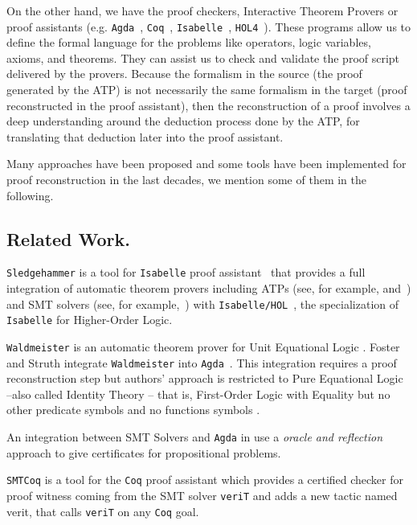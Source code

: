 \documentclass[runningheads,a4paper]{llncs}
\begin{document}
On the other hand, we have the proof checkers, Interactive Theorem Provers
or proof assistants (e.g. \verb!Agda!~\cite{agdateam}, \verb!Coq!~\cite{coqteam}, \verb!Isabelle!~\cite{paulson1994isabelle}, \verb!HOL4!~\cite{norrish2007hol}). These programs allow us to define the formal language for the problems like operators, logic variables, axioms, and theorems. They can assist us to check and validate the proof script delivered by the provers. Because the formalism in the source (the proof generated by the ATP) is not necessarily the same formalism in the target (proof reconstructed in the proof assistant), then the reconstruction of a proof involves a deep understanding around the deduction process done by the ATP, for translating that deduction later into the proof assistant.

Many approaches have been proposed and some tools have been implemented for proof reconstruction in the last decades, we mention some of them in the following.

\subsection*{Related Work.}\label{Related Work}
\par
\verb!Sledgehammer! is a tool for \verb!Isabelle! proof assistant~\cite{paulson1994isabelle} that provides a full integration of automatic theorem provers including ATPs (see, for example, \cite{meng2006automation} and~\cite{blanchette2013extending}) and SMT solvers (see, for example,~\cite{blanchette2013extending}) with \verb!Isabelle/HOL!~\cite{nipkow2002isabelle}, the specialization of \verb!Isabelle! for Higher-Order Logic.

\verb!Waldmeister! is an automatic theorem prover for Unit Equational Logic \cite{hillenbrand1997}. Foster and Struth \cite{foster2011integrating} integrate \verb!Waldmeister! into \verb!Agda!~\cite{agdateam}. This integration requires a proof reconstruction step but authors' approach is restricted to Pure Equational Logic --also called Identity Theory \cite{humberstone2011}-- that is, First-Order Logic with Equality but no other predicate symbols and no functions symbols \cite{appel1959}.

An integration between SMT Solvers and \verb!Agda! in \cite{kanso2016light} use a \emph{oracle and reflection} approach to give certificates for propositional problems.

\verb!SMTCoq! \cite{armand2011} is a tool for the \verb!Coq! proof assistant \cite{coqteam} which provides a certified checker for proof witness coming from the SMT solver \verb!veriT! \cite{bouton2009} and adds a new tactic named verit, that calls \verb!veriT! on any \verb!Coq! goal.
\end{document}
